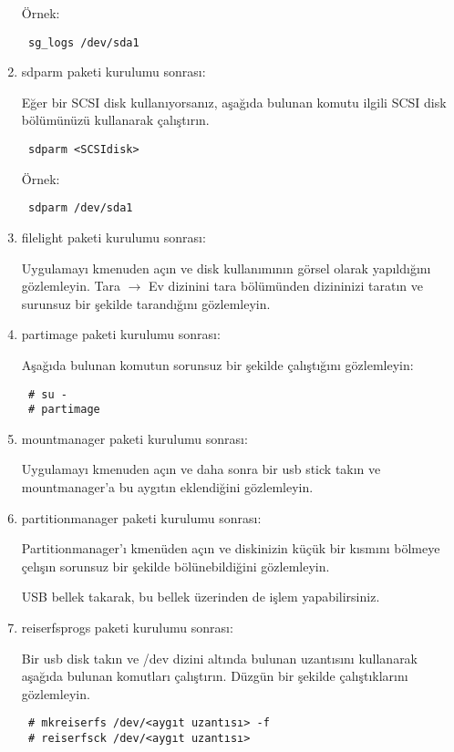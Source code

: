 \documentclass[a4paper,10pt]{article}
\begin{document}
\begin{enumerate}
Örnek:
\begin{verbatim}
 sg_logs /dev/sda1
\end{verbatim}

\item sdparm paketi kurulumu sonrası:

Eğer bir SCSI disk kullanıyorsanız, aşağıda bulunan komutu ilgili SCSI disk bölümünüzü kullanarak çalıştırın.
\begin{verbatim}
 sdparm <SCSIdisk>
\end{verbatim}

Örnek:
\begin{verbatim}
 sdparm /dev/sda1
\end{verbatim}


\item filelight paketi kurulumu sonrası:

Uygulamayı kmenuden açın ve disk kullanımının görsel olarak yapıldığını gözlemleyin. Tara $\rightarrow$ Ev dizinini tara bölümünden dizininizi taratın ve surunsuz bir şekilde tarandığını gözlemleyin.
 \item partimage paketi kurulumu sonrası:

Aşağıda bulunan komutun sorunsuz bir şekilde çalıştığını gözlemleyin:
\begin{verbatim}
 # su -
 # partimage
\end{verbatim}

 \item mountmanager paketi kurulumu sonrası:

Uygulamayı kmenuden açın ve daha sonra bir usb stick takın ve mountmanager'a bu aygıtın eklendiğini gözlemleyin.
 \item partitionmanager paketi kurulumu sonrası:

Partitionmanager'ı kmenüden açın ve diskinizin küçük bir kısmını bölmeye çelışın sorunsuz bir şekilde bölünebildiğini gözlemleyin.

USB bellek takarak, bu bellek üzerinden de işlem yapabilirsiniz.

\item reiserfsprogs paketi kurulumu sonrası:

Bir usb disk takın ve /dev dizini altında bulunan uzantısını kullanarak aşağıda bulunan komutları çalıştırın. Düzgün bir şekilde çalıştıklarını gözlemleyin. 

\begin{verbatim}
 # mkreiserfs /dev/<aygıt uzantısı> -f
 # reiserfsck /dev/<aygıt uzantısı>
\end{verbatim}

\end{enumerate}
\end{document}
